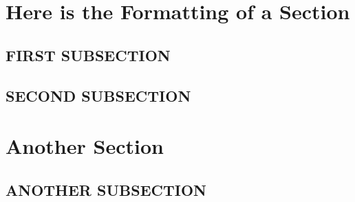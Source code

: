\lipsum[2-4]

\pagebreak
\begin{callout}[title=A CALLOUT SPANS THE PAGE]
\lipsum[3]
\end{callout}

\section{Here is the Formatting of a Section}

\lipsum[2]

\subsection{FIRST SUBSECTION}

\lipsum[1]

\subsection{SECOND SUBSECTION}

\lipsum[1]

\section{Another Section}

\lipsum[1]

\subsection{ANOTHER SUBSECTION}

\lipsum[1]




